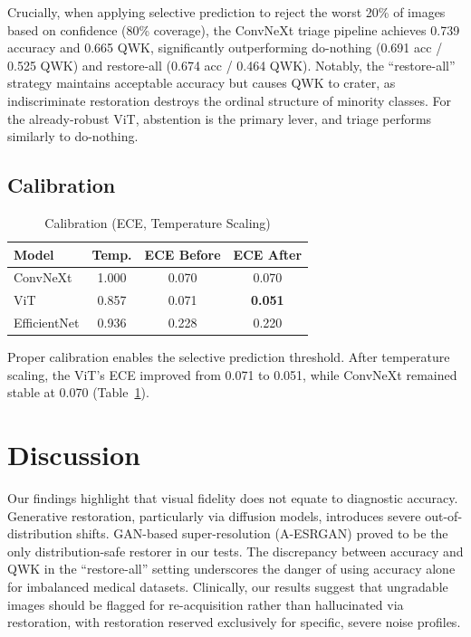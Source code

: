 \documentclass[runningheads]{llncs}
\begin{document}
Crucially, when applying selective prediction to reject the worst 20\% of images based on confidence (80\% coverage), the ConvNeXt triage pipeline achieves 0.739 accuracy and 0.665 QWK, significantly outperforming do-nothing (0.691 acc / 0.525 QWK) and restore-all (0.674 acc / 0.464 QWK). Notably, the ``restore-all'' strategy maintains acceptable accuracy but causes QWK to crater, as indiscriminate restoration destroys the ordinal structure of minority classes. For the already-robust ViT, abstention is the primary lever, and triage performs similarly to do-nothing.

\subsection{Calibration}

\begin{table}[!t]
\caption{Calibration (ECE, Temperature Scaling)}
\label{tab:calibration}
\begin{center}
\begin{tabular}{lccc}
\toprule
\textbf{Model} & \textbf{Temp.} & \textbf{ECE Before} & \textbf{ECE After} \\
\midrule
ConvNeXt     & 1.000 & 0.070 & 0.070 \\
ViT          & 0.857 & 0.071 & \textbf{0.051} \\
EfficientNet & 0.936 & 0.228 & 0.220 \\
\bottomrule
\end{tabular}
\end{center}
\end{table}

Proper calibration enables the selective prediction threshold. After temperature scaling, the ViT's ECE improved from 0.071 to 0.051, while ConvNeXt remained stable at 0.070 (Table~\ref{tab:calibration}).

\section{Discussion}
Our findings highlight that visual fidelity does not equate to diagnostic accuracy. Generative restoration, particularly via diffusion models, introduces severe out-of-distribution shifts. GAN-based super-resolution (A-ESRGAN) proved to be the only distribution-safe restorer in our tests. The discrepancy between accuracy and QWK in the ``restore-all'' setting underscores the danger of using accuracy alone for imbalanced medical datasets. Clinically, our results suggest that ungradable images should be flagged for re-acquisition rather than hallucinated via restoration, with restoration reserved exclusively for specific, severe noise profiles.
\end{document}
